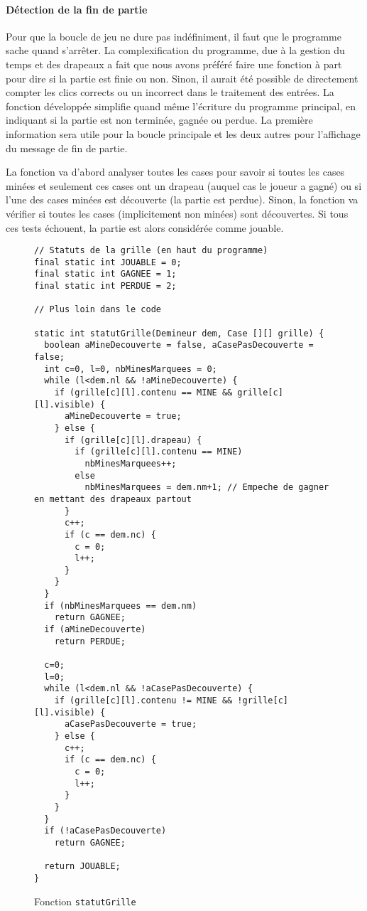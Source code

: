 \documentclass[a4paper, 12pt, oneside]{article}
\newcommand{\var}[1]{\texttt{#1}}
\begin{document}
\paragraph{Détection de la fin de partie} Pour que la boucle de jeu ne dure pas indéfiniment, il faut que le programme sache quand s'arrêter. La complexification du programme, due à la gestion du temps et des drapeaux a fait que nous avons préféré faire une fonction à part pour dire si la partie est finie ou non. Sinon, il aurait été possible de directement compter les clics corrects ou un incorrect dans le traitement des entrées. La fonction développée simplifie quand même l'écriture du programme principal, en indiquant si la partie est non terminée, gagnée ou perdue. La première information sera utile pour la boucle principale et les deux autres pour l'affichage du message de fin de partie.

La fonction va d'abord analyser toutes les cases pour savoir si toutes les cases minées et seulement ces cases ont un drapeau (auquel cas le joueur a gagné) ou si l'une des cases minées est découverte (la partie est perdue). Sinon, la fonction va vérifier si toutes les cases (implicitement non minées) sont découvertes. Si tous ces tests échouent, la partie est alors considérée comme jouable.
\begin{figure}[hpt]
	\center
	\caption{\label{fig:fnStatut} Fonction \var{statutGrille}}
\begin{lstlisting}
// Statuts de la grille (en haut du programme)
final static int JOUABLE = 0;
final static int GAGNEE = 1;
final static int PERDUE = 2;

// Plus loin dans le code

static int statutGrille(Demineur dem, Case [][] grille) {
  boolean aMineDecouverte = false, aCasePasDecouverte = false;
  int c=0, l=0, nbMinesMarquees = 0;
  while (l<dem.nl && !aMineDecouverte) {
    if (grille[c][l].contenu == MINE && grille[c][l].visible) {
      aMineDecouverte = true;
    } else {
      if (grille[c][l].drapeau) {
        if (grille[c][l].contenu == MINE)
          nbMinesMarquees++;
        else
          nbMinesMarquees = dem.nm+1; // Empeche de gagner en mettant des drapeaux partout
      }
      c++;
      if (c == dem.nc) {
        c = 0;
        l++;
      }
    }
  }
  if (nbMinesMarquees == dem.nm)
    return GAGNEE;
  if (aMineDecouverte)
    return PERDUE;
  
  c=0;
  l=0;
  while (l<dem.nl && !aCasePasDecouverte) {
    if (grille[c][l].contenu != MINE && !grille[c][l].visible) {
      aCasePasDecouverte = true;
    } else {
      c++;
      if (c == dem.nc) {
        c = 0;
        l++;
      }
    }
  }
  if (!aCasePasDecouverte)
    return GAGNEE;
  
  return JOUABLE;
}
\end{lstlisting}
\end{figure}
\end{document}

